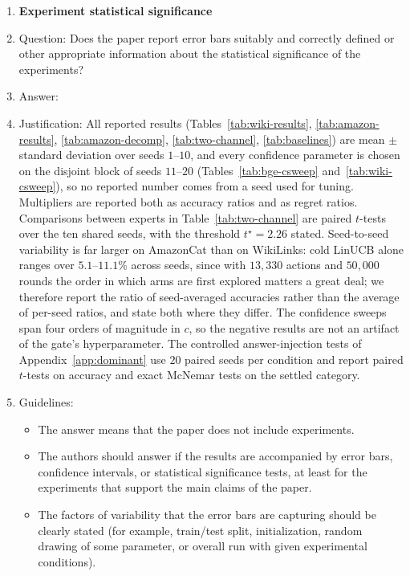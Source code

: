 \documentclass{article}
\theoremstyle{definition}
\theoremstyle{remark}
\theoremstyle{remark}
\begin{document}
\begin{enumerate}
\item {\bf Experiment statistical significance}
    \item[] Question: Does the paper report error bars suitably and correctly defined or other appropriate information about the statistical significance of the experiments?
    \item[] Answer: \answerYes{} %
    \item[] Justification: All reported results (Tables~\ref{tab:wiki-results}, \ref{tab:amazon-results}, \ref{tab:amazon-decomp}, \ref{tab:two-channel}, \ref{tab:baselines}) are mean $\pm$ standard deviation over seeds $1$--$10$, and every confidence parameter is chosen on the disjoint block of seeds $11$--$20$ (Tables~\ref{tab:bge-csweep} and~\ref{tab:wiki-csweep}), so no reported number comes from a seed used for tuning. Multipliers are reported both as accuracy ratios and as regret ratios. Comparisons between experts in Table~\ref{tab:two-channel} are paired $t$-tests over the ten shared seeds, with the threshold $t^\star=2.26$ stated. Seed-to-seed variability is far larger on AmazonCat than on WikiLinks: cold LinUCB alone ranges over $5.1$--$11.1\%$ across seeds, since with $13{,}330$ actions and $50{,}000$ rounds the order in which arms are first explored matters a great deal; we therefore report the ratio of seed-averaged accuracies rather than the average of per-seed ratios, and state both where they differ. The confidence sweeps span four orders of magnitude in $c$, so the negative results are not an artifact of the gate's hyperparameter. The controlled answer-injection tests of Appendix~\ref{app:dominant} use $20$ paired seeds per condition and report paired $t$-tests on accuracy and exact McNemar tests on the settled category.
    \item[] Guidelines:
    \begin{itemize}
        \item The answer \answerNA{} means that the paper does not include experiments.
        \item The authors should answer \answerYes{} if the results are accompanied by error bars, confidence intervals, or statistical significance tests, at least for the experiments that support the main claims of the paper.
        \item The factors of variability that the error bars are capturing should be clearly stated (for example, train/test split, initialization, random drawing of some parameter, or overall run with given experimental conditions).

\end{itemize}
\end{enumerate}
\end{document}
